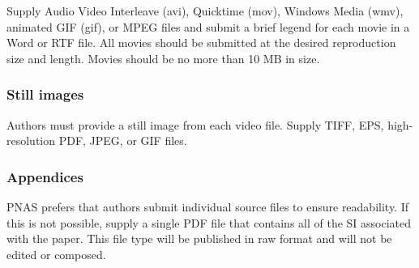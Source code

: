 \documentclass[9pt,twocolumn,twoside,lineno]{pnas-new}
\begin{document}
Supply Audio Video Interleave (avi), Quicktime (mov), Windows Media (wmv), animated GIF (gif), or MPEG files and submit a brief legend for each movie in a Word or RTF file. All movies should be submitted at the desired reproduction size and length. Movies should be no more than 10 MB in size.

\subsubsection*{Still images}

Authors must provide a still image from each video file. Supply TIFF, EPS, high-resolution PDF, JPEG, or GIF files.

\subsubsection*{Appendices}

PNAS prefers that authors submit individual source files to ensure readability. If this is not possible, supply a single PDF file that contains all of the SI associated with the paper. This file type will be published in raw format and will not be edited or composed.


\showmatmethods %


\showacknow %

\pnasbreak


\end{document}
